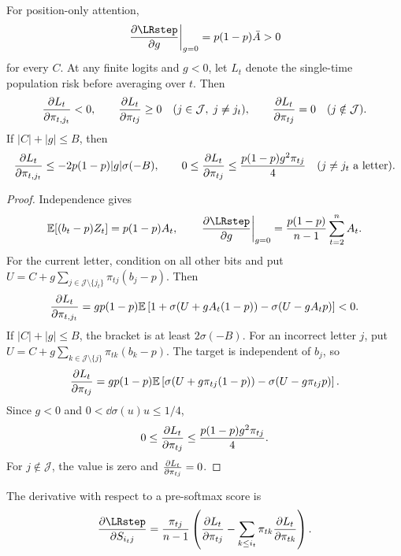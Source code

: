\begin{lrlemma}
\label{lem:lr-signs}
For position-only attention,
\begin{equation}\label{eq:lr-initial-gate-gradient}
 \left.\frac{\partial\LRstep}{\partial g}\right|_{g=0}
 =p(1-p)\bar A>0
\end{equation}
for every $C$. At any finite logits and $g<0$, let $L_t$ denote the single-time population risk before averaging over $t$. Then
\begin{equation}\label{eq:lr-feature-source-signs}
 \pd{L_t}{\pi_{t,j_t}}<0,\qquad \pd{L_t}{\pi_{tj}}\ge0
 \quad(j\in\mathcal J,\;j\ne j_t),\qquad
 \pd{L_t}{\pi_{tj}}=0\quad(j\notin\mathcal J).
\end{equation}
If $|C|+|g|\le B$, then
\begin{equation}\label{eq:lr-source-bounds}
 \pd{L_t}{\pi_{t,j_t}}\le-2p(1-p)|g|\sigma(-B),\qquad
 0\le \pd{L_t}{\pi_{tj}}\le\frac{p(1-p) g^2\pi_{tj}}4\quad(j\ne j_t\text{ a letter}).
\end{equation}
\end{lrlemma}
\begin{proof}
Independence gives
\[
 \mathbb E[(b_t-p)Z_t]=p(1-p)A_t,\qquad
 \left.\pd{\LRstep}{g}\right|_{g=0}
 =\frac{p(1-p)}{n-1}\sum_{t=2}^n A_t.
\]
For the current letter, condition on all other bits and put
$U=C+g\sum_{j\in\mathcal J\setminus\{j_t\}}\pi_{tj}(b_j-p)$. Then
\[
 \pd{L_t}{\pi_{t,j_t}}=gp(1-p)\mathbb E
 \left[1+\sigma(U+gA_t(1-p))-\sigma(U-gA_tp)\right]<0.
\]
If $|C|+|g|\le B$, the bracket is at least $2\sigma(-B)$.
For an incorrect letter $j$, put
$U=C+g\sum_{k\in\mathcal J\setminus\{j\}}\pi_{tk}(b_k-p)$.
The target is independent of $b_j$, so
\[
 \pd{L_t}{\pi_{tj}}=gp(1-p)\mathbb E
 \left[\sigma(U+g\pi_{tj}(1-p))-\sigma(U-g\pi_{tj}p)\right].
\]
Since $g<0$ and $0<\dd{\sigma(u)}{u}\le1/4$,
\[
 0\le\pd{L_t}{\pi_{tj}}\le\frac{p(1-p)g^2\pi_{tj}}4.
\]
For $j\notin\mathcal J$, the value is zero and $\pd{L_t}{\pi_{tj}}=0$.
\end{proof}

The derivative with respect to a pre-softmax score is
\begin{equation}
 \pd{\LRstep}{S_{i_tj}}=\frac{\pi_{tj}}{n-1}
 \left(\pd{L_t}{\pi_{tj}}-\sum_{k\le i_t}\pi_{tk}\pd{L_t}{\pi_{tk}}\right).
\end{equation}


